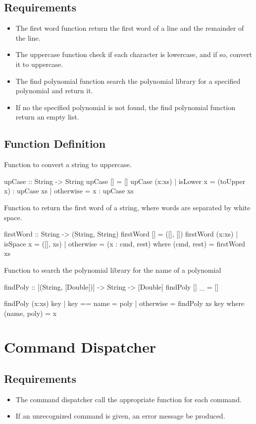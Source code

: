 \subsection{Requirements}
\begin{itemize}
\item The first word function  return the first word of a line and the remainder of the line.
\item The uppercase function  check if each character is lowercase, and if so, convert it to uppercase.
\item The find polynomial function  search the polynomial library for a specified polynomial and return it.
\item If no the specified polynomial is not found, the find polynomial function  return an empty list.
\end{itemize}

\subsection{Function Definition}
Function to convert a string to uppercase.
\begin{code}
upCase :: String -> String
upCase [] = []
upCase (x:xs)
  | isLower x = (toUpper x) : upCase xs
  | otherwise = x : upCase xs
\end{code}
Function to return the first word of a string, where words are separated by white space.
\begin{code}
firstWord :: String -> (String, String)
firstWord [] = ([], [])
firstWord (x:xs)
  | isSpace x = ([], xs)
  | otherwise = (x : cmd, rest)
    where
      (cmd, rest) = firstWord xs
\end{code}
Function to search the polynomial library for the name of a polynomial
\begin{code}
findPoly :: [(String, [Double])] -> String -> [Double]
findPoly [] _ = []

findPoly (x:xs) key
  | key == name = poly
  | otherwise   = findPoly xs key
  where
    (name, poly) = x
\end{code}

\section{Command Dispatcher}
\subsection{Requirements}
\begin{itemize}
\item The command dispatcher  call the appropriate function for each command.
\item If an unrecognized command is given, an error message  be produced.
\end{itemize}
